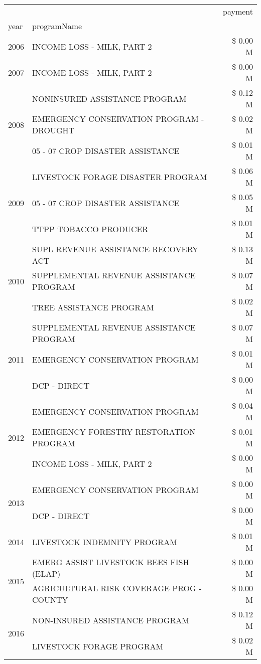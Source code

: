 \begin{tabular}{llr}
\toprule
 &  & payment \\
year & programName &  \\
\midrule
2006 & INCOME LOSS - MILK, PART 2 & \$ 0.00 M \\
\cline{1-3}
2007 & INCOME LOSS - MILK, PART 2 & \$ 0.00 M \\
\cline{1-3}
\multirow[t]{3}{*}{2008} & NONINSURED ASSISTANCE PROGRAM & \$ 0.12 M \\
 & EMERGENCY CONSERVATION PROGRAM - DROUGHT & \$ 0.02 M \\
 & 05 - 07 CROP DISASTER ASSISTANCE & \$ 0.01 M \\
\cline{1-3}
\multirow[t]{3}{*}{2009} & LIVESTOCK FORAGE DISASTER  PROGRAM & \$ 0.06 M \\
 & 05 - 07 CROP DISASTER ASSISTANCE & \$ 0.05 M \\
 & TTPP TOBACCO PRODUCER & \$ 0.01 M \\
\cline{1-3}
\multirow[t]{3}{*}{2010} & SUPL REVENUE ASSISTANCE RECOVERY ACT & \$ 0.13 M \\
 & SUPPLEMENTAL REVENUE ASSISTANCE PROGRAM & \$ 0.07 M \\
 & TREE ASSISTANCE PROGRAM & \$ 0.02 M \\
\cline{1-3}
\multirow[t]{3}{*}{2011} & SUPPLEMENTAL REVENUE ASSISTANCE PROGRAM & \$ 0.07 M \\
 & EMERGENCY CONSERVATION PROGRAM & \$ 0.01 M \\
 & DCP - DIRECT & \$ 0.00 M \\
\cline{1-3}
\multirow[t]{3}{*}{2012} & EMERGENCY CONSERVATION PROGRAM & \$ 0.04 M \\
 & EMERGENCY FORESTRY RESTORATION PROGRAM & \$ 0.01 M \\
 & INCOME LOSS - MILK, PART 2 & \$ 0.00 M \\
\cline{1-3}
\multirow[t]{2}{*}{2013} & EMERGENCY CONSERVATION PROGRAM & \$ 0.00 M \\
 & DCP - DIRECT & \$ 0.00 M \\
\cline{1-3}
2014 & LIVESTOCK INDEMNITY PROGRAM & \$ 0.01 M \\
\cline{1-3}
\multirow[t]{2}{*}{2015} & EMERG ASSIST LIVESTOCK BEES FISH (ELAP) & \$ 0.00 M \\
 & AGRICULTURAL RISK COVERAGE PROG - COUNTY & \$ 0.00 M \\
\cline{1-3}
\multirow[t]{3}{*}{2016} & NON-INSURED ASSISTANCE PROGRAM & \$ 0.12 M \\
 & LIVESTOCK FORAGE PROGRAM & \$ 0.02 M \\

\end{tabular}
